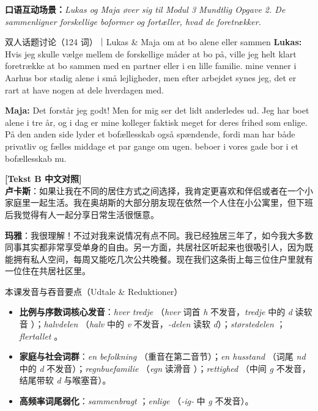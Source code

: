 \textbf{口语互动场景：}\textit{Lukas og Maja øver sig til Modul 3 Mundtlig Opgave 2. De sammenligner forskellige boformer og fortæller, hvad de foretrækker.}

\vspace{0.3em}
\begin{emailbox}{双人话题讨论（124 词）｜Lukas \& Maja om at bo alene eller sammen}
\textbf{Lukas:} Hvis jeg skulle vælge mellem de forskellige måder at bo på, ville jeg helt klart foretrække at bo sammen med en partner eller i en lille familie.  mine venner i Aarhus bor stadig alene i små lejligheder, men efter arbejdet synes jeg, det er rart at have nogen at dele hverdagen med.

\vspace{0.35em}
\textbf{Maja:} Det forstår jeg godt! Men for mig ser det lidt anderledes ud. Jeg har boet alene i tre år, og i dag er  mine kolleger faktisk meget  for deres frihed som enlige. På den anden side lyder et bofællesskab også spændende, fordi man har både privatliv og fælles middage et par gange om ugen.  beboer i vores gade bor i et bofællesskab nu.
\end{emailbox}

\begin{transbox}
\small
\textbf{\color{NCDTeal}[Tekst B 中文对照]}\\
\textbf{卢卡斯}：如果让我在不同的居住方式之间选择，我肯定更喜欢和伴侣或者在一个小家庭里一起生活。我在奥胡斯的大部分朋友现在依然一个人住在小公寓里，但下班后我觉得有人一起分享日常生活很惬意。

\textbf{玛雅}：我很理解！不过对我来说情况有点不同。我已经独居三年了，如今我大多数同事其实都非常享受单身的自由。另一方面，共居社区听起来也很吸引人，因为既能拥有私人空间，每周又能吃几次公共晚餐。现在我们这条街上每三位住户里就有一位住在共居社区里。
\end{transbox}

\begin{tipbox}{本课发音与吞音要点（Udtale \& Reduktioner）}
\begin{itemize}
  \item \textbf{比例与序数词核心发音}：\textit{hver tredje} （\textit{hver} 词首 \textit{h} 不发音，\textit{tredje} 中的 \textit{d} 读软音 ）；\textit{halvdelen} （\textit{halv} 中的 \textit{v} 不发音，\textit{-delen} 读软 \textit{d}）；\textit{størstedelen} ；\textit{flertallet} 。
  \item \textbf{家庭与社会词群}：\textit{en befolkning} （重音在第二音节）；\textit{en husstand} （词尾 \textit{nd} 中的 \textit{d} 不发音）；\textit{regnbuefamilie} （\textit{egn} 读滑音 ）；\textit{rettighed} （中间 \textit{g} 不发音，结尾带软 \textit{d} 与喉塞音）。
  \item \textbf{高频率词尾弱化}：\textit{sammenbragt} ；\textit{enlige} （\textit{-ig-} 中 \textit{g} 不发音）。
\end{itemize}
\end{tipbox}

